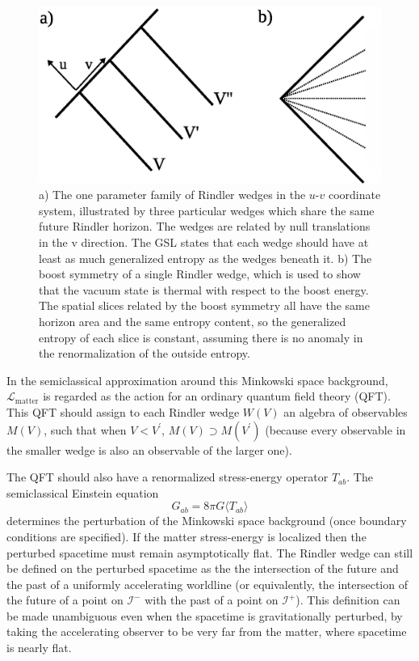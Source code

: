 \documentclass{article}
\begin{document}
\begin{figure}[ht]
\centering
\includegraphics[width=.9\textwidth]{wedges.eps}
\caption{\footnotesize a) The one parameter family of Rindler wedges in the $u$-$v$ coordinate system, illustrated by three particular wedges which share the same future Rindler horizon.  The wedges are related by null translations in the v direction.  The GSL states that each wedge should have at least as much generalized entropy as the wedges beneath it.  b) The boost symmetry of a single Rindler wedge, which is used to show that the vacuum state is thermal with respect to the boost energy.  The spatial slices related by the boost symmetry all have the same horizon area and the same entropy content, so the generalized entropy of each slice is constant, assuming there is no anomaly in the renormalization of the outside entropy.} \label{wedges}
\end{figure}

In the semiclassical approximation around this Minkowski space background, $\mathcal{L}_\mathrm{matter}$ is regarded as the action for an ordinary quantum field theory (QFT).   This QFT should assign to each Rindler wedge $W(V)$ an algebra of observables $M(V)$, such that when $V < V^\prime$, $M(V) \supset M(V^\prime)$ (because every observable in the smaller wedge is also an observable of the larger one).  

The QFT should also have a renormalized stress-energy operator $T_{ab}$.  The semiclassical Einstein equation
\begin{equation}\label{semiEin}
G_{ab} = 8\pi G \langle T_{ab} \rangle
\end{equation}
determines the perturbation of the Minkowski space background (once boundary conditions are specified).  If the matter stress-energy is localized then the perturbed spacetime must remain asymptotically flat.  The Rindler wedge can still be defined on the perturbed spacetime as the the intersection of the future and the past of a uniformly accelerating worldline (or equivalently, the intersection of the future of a point on $\mathcal{I}^-$ with the past of a point on $\mathcal{I}^+$).  This definition can be made unambiguous even when the spacetime is gravitationally perturbed, by taking the accelerating observer to be very far from the matter, where spacetime is nearly flat.
\end{document}

